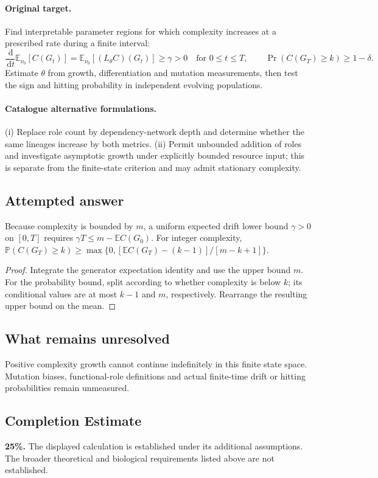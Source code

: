 \documentclass[11pt]{article}
\begin{document}
\paragraph{Original target.}
Find interpretable parameter regions for which complexity increases at a prescribed rate during a finite interval:
\[
 \frac{\,\mathrm{d}}{\,\mathrm{d} t}\mathbb{E}_{\nu_0}[C(G_t)]
 =\mathbb{E}_{\nu_0}[(L_\theta C)(G_t)]\ge\gamma>0
 \quad\text{for }0\le t\le T,
 \qquad \Pr(C(G_T)\ge k)\ge1-\delta.
\]
Estimate $\theta$ from growth, differentiation and mutation measurements, then test the sign and hitting probability in independent evolving populations.
\paragraph{Catalogue alternative formulations.}
(i) Replace role count by dependency-network depth and determine whether the same lineages increase by both metrics. (ii) Permit unbounded addition of roles and investigate asymptotic growth under explicitly bounded resource input; this is separate from the finite-state criterion and may admit stationary complexity.
\subsection{Attempted answer}
\begin{proposition}
Because complexity is bounded by $m$, a uniform expected drift lower bound $\gamma>0$ on $[0,T]$ requires $\gamma T\leq m-\mathbb{E} C(G_0)$. For integer complexity, $\mathbb{P}(C(G_T)\geq k)\geq\max\{0,[\mathbb{E} C(G_T)-(k-1)]/[m-k+1]\}$.
\end{proposition}
\begin{proof}
Integrate the generator expectation identity and use the upper bound $m$. For the probability bound, split according to whether complexity is below $k$; its conditional values are at most $k-1$ and $m$, respectively. Rearrange the resulting upper bound on the mean.
\end{proof}
\subsection{What remains unresolved}
Positive complexity growth cannot continue indefinitely in this finite state space. Mutation biases, functional-role definitions and actual finite-time drift or hitting probabilities remain unmeasured.
\subsection{Completion Estimate}
\textbf{25\%.} The displayed calculation is established under its additional assumptions. The broader theoretical and biological requirements listed above are not established.
\end{document}
